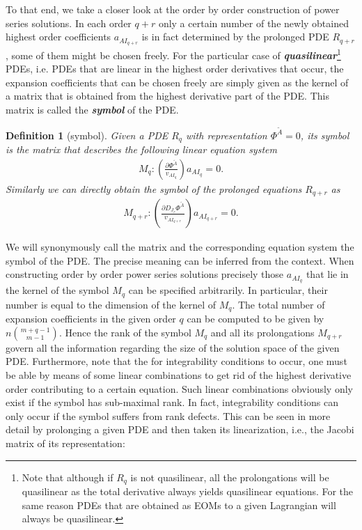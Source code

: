\documentclass[a4paper,12pt, DIV=14, BCOR=5mm, twoside, headsepline, numbers=noenddot]{scrbook}
\newtheorem{definition}{Definition}[section]
\begin{document}
To that end, we take a closer look at the order by order construction of power series solutions.
In each order $q+r$ only a certain number of the newly obtained highest order coefficients $a_{AI_{q+r}}$ is in fact determined by the prolonged PDE $R_{q+r}$, some of them might be chosen freely.
For the particular case of \textit{\textbf{quasilinear}}\footnote{Note that although if $R_q$ is not quasilinear, all the prolongations will be quasilinear as the total derivative always yields quasilinear equations. For the same reason PDEs that are obtained as EOMs to a given Lagrangian will always be quasilinear.} PDEs, i.e. PDEs that are linear in the highest order derivatives that occur, the expansion coefficients that can be chosen freely are simply given as the kernel of a matrix that is obtained from the highest derivative part of the PDE. This matrix is called the \textit{\textbf{symbol}} of the PDE.
\begin{definition}[symbol]
Given a PDE $R_q$ with representation $\Phi^{\tilde{A}}=0$, its symbol is the matrix that describes the following linear equation system 
\begin{align}
    M_q : \left ( \frac{\partial \Phi^{\tilde{A}}}{v_{AI_q}} \right ) a_{AI_q} = 0.
\end{align}
Similarly we can directly obtain the symbol of the prolonged equations $R_{q+r}$ as  
\begin{align}
    M_{q+r} : \left ( \frac{\partial D_{J_r}\Phi^{\tilde{A}
    }}{v_{AI_{q+r}}} \right ) a_{AI_{q+r}} = 0. 
\end{align}
\end{definition}
We will synonymously call the matrix and the corresponding equation system the symbol of the PDE. The precise meaning can be inferred from the context. When constructing order by order power series solutions precisely those $a_{AI_q}$ that lie in the kernel of the symbol $M_q$ can be specified arbitrarily. In particular, their number is equal to the dimension of the kernel of $M_q$. The total number of expansion coefficients in the given order $q$ can be computed to be given by $n\binom{m+q-1}{m-1}$.
Hence the rank of the symbol $M_q$ and all its prolongations $M_{q+r}$ govern all the information regarding the size of the solution space of the given PDE. Furthermore, note that the for integrability conditions to occur, one must be able by means of some linear combinations to get rid of the highest derivative order contributing to a certain equation. Such linear combinations obviously only exist if the symbol has sub-maximal rank.  In fact, integrability conditions can only occur if the symbol suffers from rank defects. This can be seen in more detail by prolonging a given PDE and then taken its linearization, i.e., the Jacobi matrix of its representation:
\end{document}
